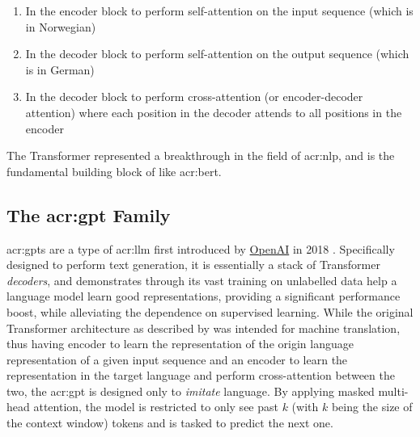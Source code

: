 \begin{enumerate}
    \item In the encoder block to perform self-attention on the input sequence (which is in Norwegian)
    \item In the decoder block to perform self-attention on the output sequence (which is in German)
    \item In the decoder block to perform cross-attention (or encoder-decoder attention) where each position in the decoder attends to all positions in the encoder
\end{enumerate}

The Transformer represented a breakthrough in the field of \gls{acr:nlp}, and is the fundamental building block of  like \acrshort{acr:bert}.


\subsection[The GPT Family]{The \acrshort{acr:gpt} Family}\label{subsec:gpt}

\glspl{acr:gpt} are a type of \gls{acr:llm} first introduced by \hyperref[subsec:openai]{OpenAI} in 2018 \citep{radfordImprovingLanguageUnderstanding2018}. Specifically designed to perform text generation, it is essentially a stack of Transformer \textit{decoders}, and demonstrates through its vast training on unlabelled data help a language model learn good representations, providing a significant performance boost, while alleviating the dependence on supervised learning. While the original Transformer architecture as described by \cite{vaswaniAttentionAllYou2017} was intended for machine translation, thus having encoder to learn the representation of the origin language representation of a given input sequence and an encoder to learn the representation in the target language and perform cross-attention between the two, the \acrshort{acr:gpt} is designed only to \textit{imitate} language. By applying masked multi-head attention, the model is restricted to only see past $k$ (with $k$ being the size of the context window) tokens and is tasked to predict the next one.

